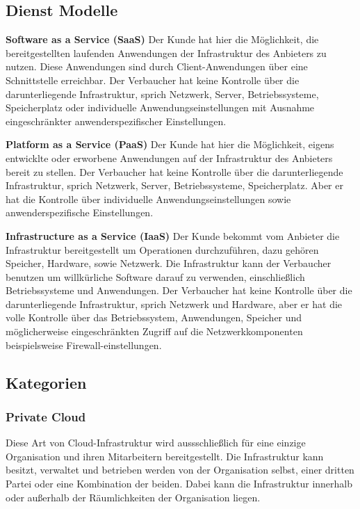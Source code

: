 \subsection{Dienst Modelle}
\textbf{Software as a Service (SaaS)} \hfill
Der Kunde hat hier die Möglichkeit, die bereitgestellten laufenden Anwendungen der Infrastruktur des Anbieters zu nutzen. Diese Anwendungen sind durch Client-Anwendungen über eine Schnittstelle erreichbar. Der Verbaucher hat keine Kontrolle über die darunterliegende Infrastruktur, sprich Netzwerk, Server, Betriebssysteme, Speicherplatz oder individuelle Anwendungseinstellungen mit Ausnahme eingeschränkter anwenderspezifischer Einstellungen.

\textbf{Platform as a Service (PaaS)} \hfill
Der Kunde hat hier die Möglichkeit, eigens entwicklte oder erworbene Anwendungen auf der Infrastruktur des Anbieters bereit zu stellen. Der Verbaucher hat keine Kontrolle über die darunterliegende Infrastruktur, sprich Netzwerk, Server, Betriebssysteme, Speicherplatz. Aber er hat die Kontrolle über individuelle Anwendungseinstellungen sowie anwenderspezifische Einstellungen.

\textbf{Infrastructure as a Service (IaaS)} \hfill
Der Kunde bekommt vom Anbieter die Infrastruktur bereitgestellt um Operationen durchzuführen, dazu gehören Speicher, Hardware, sowie Netzwerk. Die Infrastruktur kann der Verbaucher benutzen um willkürliche Software darauf zu verwenden, einschließlich Betriebssysteme und Anwendungen. Der Verbaucher hat keine Kontrolle über die darunterliegende Infrastruktur, sprich Netzwerk und Hardware, aber er hat die volle Kontrolle über das Betriebssystem, Anwendungen, Speicher und möglicherweise eingeschränkten Zugriff auf die Netzwerkkomponenten beispielsweise Firewall-einstellungen.

\subsection{Kategorien}
\subsubsection{Private Cloud}
Diese Art von Cloud-Infrastruktur wird aussschließlich für eine einzige Organisation und ihren Mitarbeitern bereitgestellt. Die Infrastruktur kann besitzt, verwaltet und betrieben werden von der Organisation selbst, einer dritten Partei oder eine Kombination der beiden. Dabei kann die Infrastruktur innerhalb oder außerhalb der Räumlichkeiten der Organisation liegen.

